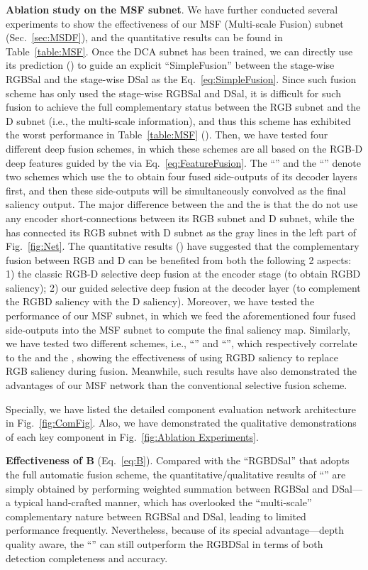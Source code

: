 \documentclass[journal]{IEEEtran}
\begin{document}
\textbf{Ablation study on the MSF subnet}.
We have further conducted several experiments to show the effectiveness of our MSF (Multi-scale Fusion) subnet (Sec.~\ref{sec:MSDF}), and the quantitative results can be found in Table~\ref{table:MSF}.
Once the DCA subnet has been trained, we can directly use its prediction () to guide an explicit ``SimpleFusion'' between the stage-wise RGBSal and the stage-wise DSal as the Eq.~\ref{eq:SimpleFusion}.
Since such fusion scheme has only used the stage-wise RGBSal and DSal, it is difficult for such fusion to achieve the full complementary status between the RGB subnet and the D subnet (i.e., the multi-scale information), and thus this scheme has exhibited the worst performance in Table~\ref{table:MSF} ().
Then, we have tested four different deep fusion schemes, in which these schemes are all based on the RGB-D deep features guided by the  via Eq.~\ref{eq:FeatureFusion}.
The ``'' and the ``'' denote two schemes which use the  to obtain four fused side-outputs of its decoder layers first, and then these side-outputs will be simultaneously convolved as the final saliency output.
The major difference between the  and the  is that the  do not use any encoder short-connections between its RGB subnet and D subnet, while the  has connected its RGB subnet with D subnet as the gray lines in the left part of Fig.~\ref{fig:Net}.
The quantitative results () have suggested that the complementary fusion between RGB and D can be benefited from both the following 2 aspects: 1) the classic RGB-D selective deep fusion at the encoder stage (to obtain RGBD saliency); 2) our  guided selective deep fusion at the decoder layer (to complement the RGBD saliency with the D saliency).
Moreover, we have tested the performance of our MSF subnet, in which we feed the aforementioned four fused side-outputs into the MSF subnet to compute the final saliency map.
Similarly, we have tested two different schemes, i.e., ``'' and ``'', which respectively correlate to the  and the , showing the effectiveness of using RGBD saliency to replace RGB saliency during fusion.
Meanwhile, such results have also demonstrated the advantages of our MSF network than the conventional selective fusion scheme.

Specially, we have listed the detailed component evaluation network architecture in Fig.~\ref{fig:ComFig}.
Also, we have demonstrated the qualitative demonstrations of each key component in Fig.~\ref{fig:Ablation Experiments}.

\textbf{Effectiveness of B} (Eq.~\ref{eq:B}).
Compared with the ``RGBDSal'' that adopts the full automatic fusion scheme, the quantitative/qualitative results of ``'' are simply obtained by performing weighted summation between RGBSal and DSal---a typical hand-crafted manner, which has overlooked the ``multi-scale'' complementary nature between RGBSal and DSal, leading to limited performance frequently.
Nevertheless, because of its special advantage---depth quality aware, the ``'' can still outperform the RGBDSal in terms of both detection completeness and accuracy.
\end{document}
